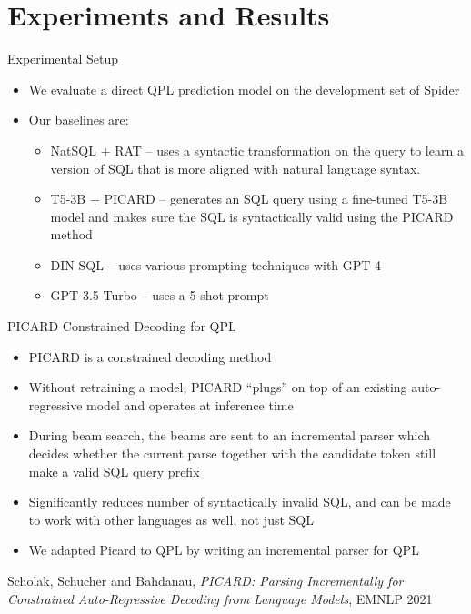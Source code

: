\documentclass{beamer}
\begin{document}
\section{Experiments and Results}

\begin{frame}{Experimental Setup}
    \begin{itemize}
        \item We evaluate a direct QPL prediction model on the development set of Spider
        \item Our baselines are:
        \begin{itemize}
            \item NatSQL + RAT -- uses a syntactic transformation on the query to learn a version of SQL that is more aligned with natural language syntax.
            \item T5-3B + PICARD -- generates an SQL query using a fine-tuned T5-3B model and makes sure the SQL is syntactically valid using the PICARD method
            \item DIN-SQL -- uses various prompting techniques with GPT-4
            \item GPT-3.5 Turbo -- uses a 5-shot prompt
        \end{itemize}
    \end{itemize}
\end{frame}

\begin{frame}{PICARD Constrained Decoding for QPL}
    \begin{itemize}
        \item PICARD is a constrained decoding method
        \item Without retraining a model, PICARD ``plugs'' on top of an existing auto-regressive model and operates at inference time
        \item During beam search, the beams are sent to an incremental parser which decides whether the current parse together with the candidate token still make a valid SQL query prefix
        \item Significantly reduces number of syntactically invalid SQL, and can be made to work with other languages as well, not just SQL
        \item We adapted Picard to QPL by writing an incremental parser for QPL
    \end{itemize}
    \tiny{Scholak, Schucher and  Bahdanau, \textit{PICARD: Parsing Incrementally for Constrained Auto-Regressive Decoding from Language Models}, EMNLP 2021}
\end{frame}
\end{document}
